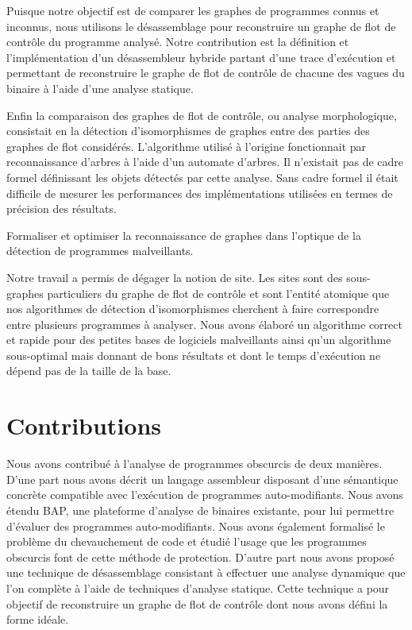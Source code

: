 Puisque notre objectif est de comparer les graphes de programmes connus et inconnus, nous utilisons le désassemblage pour reconstruire un graphe de flot de contrôle du programme analysé.
Notre contribution est la définition et l'implémentation d'un désassembleur hybride partant d'une trace d'exécution et permettant de reconstruire le graphe de flot de contrôle de chacune des vagues du binaire à l'aide d'une analyse statique.

Enfin la comparaison des graphes de flot de contrôle, ou analyse morphologique, consistait en la détection d'isomorphismes de graphes entre des parties des graphes de flot considérés. 
L'algorithme utilisé à l'origine fonctionnait par reconnaissance d'arbres à l'aide d'un automate d'arbres. Il n'existait pas de cadre formel définissant les objets détectés par cette analyse. Sans cadre formel il était difficile de mesurer les performances des implémentations utilisées en termes de précision des résultats.

\begin{pbb}
 Formaliser et optimiser la reconnaissance de graphes dans l'optique de la détection de programmes malveillants.
\end{pbb}

Notre travail a permis de dégager la notion de site. Les sites sont des sous-graphes particuliers du graphe de flot de contrôle et sont l'entité atomique que nos algorithmes de détection d'isomorphismes cherchent à faire correspondre entre plusieurs programmes à analyser. Nous avons élaboré un algorithme correct et rapide pour des petites bases de logiciels malveillants ainsi qu'un algorithme sous-optimal mais donnant de bons résultats et dont le temps d'exécution ne dépend pas de la taille de la base.

\section*{Contributions}
Nous avons contribué à l’analyse de programmes obscurcis de deux manières. 
D’une part nous avons décrit un langage assembleur disposant d’une sémantique concrète compatible avec l’exécution de programmes auto-modifiants.
Nous avons étendu BAP, une plateforme d’analyse de binaires existante, pour lui permettre d’évaluer des programmes auto-modifiants.
Nous avons également formalisé le problème du chevauchement de code et étudié l’usage que les programmes obscurcis font de cette méthode de protection. 
D’autre part nous avons proposé une technique de désassemblage consistant à effectuer une analyse dynamique que l’on complète à l’aide de techniques d’analyse statique. 
Cette technique a pour objectif de reconstruire un graphe de flot de contrôle dont nous avons défini la forme idéale.

